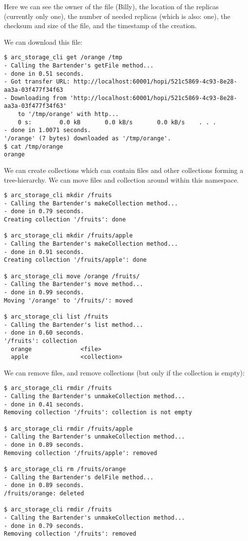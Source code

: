 \documentclass{book}
\begin{document}
Here we can see the owner of the file (Billy), the location of the replicas (currently only one), the number of needed replicas (which is also: one), the checksum and size of the file, and the timestamp of the creation.

We can download this file:

\begin{verbatim}
$ arc_storage_cli get /orange /tmp
- Calling the Bartender's getFile method...
- done in 0.51 seconds.
- Got transfer URL: http://localhost:60001/hopi/521c5869-4c93-8e28-aa3a-03f477f34f63
- Downloading from 'http://localhost:60001/hopi/521c5869-4c93-8e28-aa3a-03f477f34f63'
    to '/tmp/orange' with http...
    0 s:        0.0 kB       0.0 kB/s       0.0 kB/s    . . .       
- done in 1.0071 seconds.
'/orange' (7 bytes) downloaded as '/tmp/orange'.
$ cat /tmp/orange 
orange
\end{verbatim}

We can create collections which can contain files and other collections forming a tree-hierarchy. We can move files and collection around within this namespace.

\begin{verbatim}
$ arc_storage_cli mkdir /fruits
- Calling the Bartender's makeCollection method...
- done in 0.79 seconds.
Creating collection '/fruits': done

$ arc_storage_cli mkdir /fruits/apple
- Calling the Bartender's makeCollection method...
- done in 0.91 seconds.
Creating collection '/fruits/apple': done

$ arc_storage_cli move /orange /fruits/
- Calling the Bartender's move method...
- done in 0.99 seconds.
Moving '/orange' to '/fruits/': moved

$ arc_storage_cli list /fruits
- Calling the Bartender's list method...
- done in 0.60 seconds.
'/fruits': collection
  orange              <file>
  apple               <collection>
\end{verbatim}

We can remove files, and remove collections (but only if the collection is empty):

\begin{verbatim}
$ arc_storage_cli rmdir /fruits
- Calling the Bartender's unmakeCollection method...
- done in 0.41 seconds.
Removing collection '/fruits': collection is not empty

$ arc_storage_cli rmdir /fruits/apple
- Calling the Bartender's unmakeCollection method...
- done in 0.89 seconds.
Removing collection '/fruits/apple': removed

$ arc_storage_cli rm /fruits/orange
- Calling the Bartender's delFile method...
- done in 0.89 seconds.
/fruits/orange: deleted

$ arc_storage_cli rmdir /fruits
- Calling the Bartender's unmakeCollection method...
- done in 0.79 seconds.
Removing collection '/fruits': removed
\end{verbatim}
\end{document}

